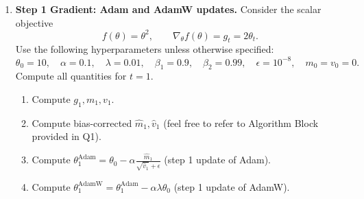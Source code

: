 \documentclass[11pt]{article}
\begin{document}
\begin{enumerate}[label=\textbf{Q\arabic*.}, leftmargin=2.2em, resume]
    \begin{algorithm}[H]
    \caption{Adam: Core Update Lines (Kingma \& Ba, 2014)}
    \begin{algorithmic}[1]
        \State $m_t \gets \beta_1 m_{t-1} + (1 - \beta_1) g_t$ 
        \State $v_t \gets \beta_2 v_{t-1} + (1 - \beta_2) g_t^2$ 
        \State $\hat{m}_t \gets m_t / (1 - \beta_1^t)$ 
        \State $\hat{v}_t \gets v_t / (1 - \beta_2^t)$ 
        \State $\theta_t \gets \theta_{t-1} - \alpha \cdot \hat{m}_t / (\sqrt{\hat{v}_t} + \epsilon)$ 
    \end{algorithmic}
    \end{algorithm}
    \par\smallskip
\textbf{Solution.}
\begin{itemize}[leftmargin=1.4em]
\item Line 7: \textbf{Momentum}; it accumulates an exponential moving average of gradients.
\item Line 8: \textbf{Adaptive Scaling (RMSProp/AdaGrad)}; the moving average of squared gradients supplies coordinatewise scale estimates.
\item Line 9: \textbf{Newly Introduced by Adam} (among the compared methods); it corrects the first moment's initial bias toward zero.
\item Line 10: \textbf{Newly Introduced by Adam} (among the compared methods); it corrects the second moment's initial bias toward zero.
\item Line 11: \textbf{Combination}; it combines the momentum numerator with adaptive scaling by the root second moment.
\end{itemize}


\newpage
\item \textbf{Step 1 Gradient: Adam and AdamW updates.}
Consider the scalar objective
\[
f(\theta) = \theta^2, \qquad \nabla_\theta f(\theta) = g_t = 2\theta_t.
\]
Use the following hyperparameters unless otherwise specified:
\[
\theta_0 = 10,\quad \alpha = 0.1,\quad \lambda = 0.01,\quad 
\beta_1 = 0.9,\quad \beta_2 = 0.99,\quad \epsilon = 10^{-8},\quad 
m_0 = v_0 = 0.
\]
Compute all quantities for $t=1$.
\begin{enumerate}[label=(\alph*)]
  \item Compute $g_1, m_1, v_1$.
  \item Compute bias-corrected $\hat m_1, \hat v_1$ (feel free to refer to Algorithm Block provided in Q1).
  \item Compute $\theta_1^{\text{Adam}} = 
        \theta_0 - \alpha \frac{\hat m_1}{\sqrt{\hat v_1} + \epsilon}$ (step 1 update of Adam).
  \item Compute $\theta_1^{\text{AdamW}} =
        \theta_1^{\text{Adam}} - \alpha \lambda \theta_0$ (step 1 update of AdamW).
\end{enumerate}


\end{enumerate}
\end{document}
